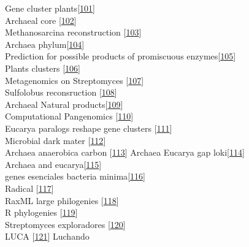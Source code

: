 \documentclass[12pt,twoside]{reedthesis}
\begin{document}
  Gene cluster
  plants{[}\protect\hyperlink{ref-osbourn_gene_2010}{101}{]}\\
  Archaeal core
  {[}\protect\hyperlink{ref-makarova_comparative_1999}{102}{]}\\
  Methanosarcina reconstruction
  {[}\protect\hyperlink{ref-benedict_genome-scale_2012}{103}{]}\\
  Archaea phylum{[}\protect\hyperlink{ref-seitz_genomic_2016}{104}{]}\\
  Prediction for possible products of promiscuous
  enzymes{[}\protect\hyperlink{ref-jeffryes_mines_2015}{105}{]}\\
  Plants clusters
  {[}\protect\hyperlink{ref-medema_computational_2016}{106}{]}\\
  Metagenomics on Streptomyces
  {[}\protect\hyperlink{ref-iqbal_natural_2016}{107}{]}\\
  Sulfolobus reconsruction
  {[}\protect\hyperlink{ref-ulas_genome-scale_2012}{108}{]}\\
  Archaeal Natural
  products{[}\protect\hyperlink{ref-charlesworth_untapped_2015}{109}{]}\\
  Computational Pangenomics
  {[}\protect\hyperlink{ref-computational_pan-genomics_consortium_computational_2016}{110}{]}\\
  Eucarya paralogs reshape gene clusters
  {[}\protect\hyperlink{ref-chan_remodelling_2015}{111}{]}\\
  Microbial dark mater
  {[}\protect\hyperlink{ref-rinke_insights_2013}{112}{]}\\
  Archaea anaerobica carbon
  {[}\protect\hyperlink{ref-castelle_genomic_2015}{113}{]} Archaea Eucarya
  gap loki{[}\protect\hyperlink{ref-spang_complex_2015}{114}{]}\\
  Archaea and
  eucarya{[}\protect\hyperlink{ref-koonin_archaeal_2015}{115}{]}\\
  genes esenciales bacteria
  minima{[}\protect\hyperlink{ref-glass_essential_2006}{116}{]}\\
  Radical {[}\protect\hyperlink{ref-narechania_random_2012}{117}{]}\\
  RaxML large philogenies
  {[}\protect\hyperlink{ref-stamatakis_raxml_2014}{118}{]}\\
  R phylogenies
  {[}\protect\hyperlink{ref-phyloseq_powerful_2016}{119}{]}\\
  Streptomyces exploradores
  {[}\protect\hyperlink{ref-zacharia_exploring_2017}{120}{]}\\
  LUCA {[}\protect\hyperlink{ref-woese_universal_1998}{121}{]} Luchando
\end{document}
